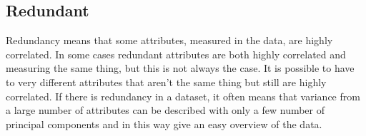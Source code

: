 \subsection*{Redundant}
Redundancy means that some attributes, measured in the data, are highly correlated. 
In some cases redundant attributes are both highly correlated and measuring the same thing, but this is not always the case. It is possible to have to very different attributes that aren't the same thing but still are highly correlated. \blankline
%
If there is redundancy in a dataset, it often means that variance from a large number of attributes can be described with only a few number of principal components and in this way give an easy overview of the data. 